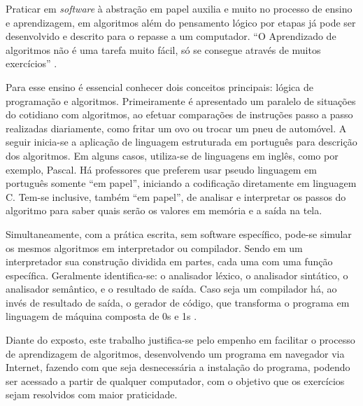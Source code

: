 \ifdraft{\color{green}}{}Praticar em \textit{software} à abstração em papel auxilia e muito no processo de ensino e aprendizagem, em algoritmos além do pensamento lógico por etapas já pode ser desenvolvido e descrito para o repasse a um computador.
``O Aprendizado de algoritmos não é uma tarefa muito fácil, só se consegue através de muitos exercícios'' \cite[p.~1]{lopes2002etal}.

Para esse ensino é essencial conhecer dois conceitos principais: lógica de programação e algoritmos. Primeiramente é apresentado um paralelo de situações do cotidiano com algoritmos, ao efetuar comparações de instruções passo a passo realizadas diariamente, como fritar um ovo ou trocar um pneu de automóvel. A seguir inicia-se a aplicação de linguagem estruturada em português para descrição dos algoritmos. Em alguns casos, utiliza-se de linguagens em inglês, como por exemplo, Pascal. Há professores que preferem usar pseudo linguagem em português somente ``em papel'', iniciando a codificação diretamente em linguagem C. Tem-se inclusive, também ``em papel'', de analisar e interpretar os passos do algoritmo para saber quais serão os valores em memória e a saída na tela.

Simultaneamente, com a prática escrita, sem software específico, pode-se simular os mesmos algoritmos em interpretador ou compilador. Sendo em um interpretador sua construção dividida em partes, cada uma com uma função específica. Geralmente identifica-se: o analisador léxico, o analisador sintático, o analisador semântico, e o resultado de saída. Caso seja um compilador há, ao invés de resultado de saída, o gerador de código, que transforma o programa em linguagem de máquina composta de 0s e 1s \cite{delamaro2004}.

Diante do exposto, este trabalho justifica-se pelo empenho em facilitar o processo de aprendizagem de algoritmos, desenvolvendo um programa em navegador via Internet, fazendo com que seja desnecessária a instalação do programa,  podendo ser acessado a partir de qualquer computador, com o objetivo que os exercícios sejam resolvidos com maior praticidade.\color{black}
